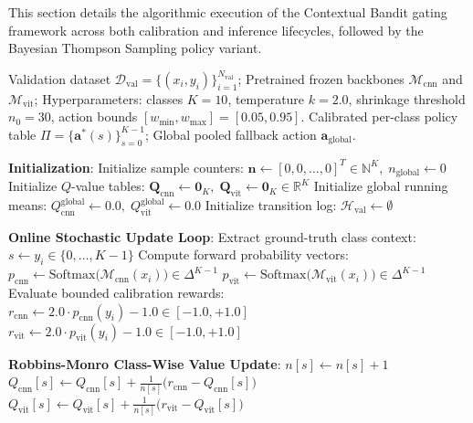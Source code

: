 \documentclass[10pt,journal,compsoc]{IEEEtran}
\begin{document}
This section details the algorithmic execution of the Contextual Bandit gating framework across both calibration and inference lifecycles, followed by the Bayesian Thompson Sampling policy variant.

\begin{algorithm}[H]
\caption{Offline Calibration via Robbins-Monro Value Estimation}
\label{alg:calibration}
\begin{algorithmic}[1]
\REQUIRE Validation dataset $\mathcal{D}_{\text{val}} = \{(x_i, y_i)\}_{i=1}^{N_{\text{val}}}$; Pretrained frozen backbones $\mathcal{M}_{\text{cnn}}$ and $\mathcal{M}_{\text{vit}}$; Hyperparameters: classes $K=10$, temperature $k=2.0$, shrinkage threshold $n_0=30$, action bounds $[w_{\min}, w_{\max}] = [0.05, 0.95]$.
\ENSURE Calibrated per-class policy table $\Pi = \{\mathbf{a}^*(s)\}_{s=0}^{K-1}$; Global pooled fallback action $\mathbf{a}_{\text{global}}$.

\STATE \textbf{Initialization}:
\STATE Initialize sample counters: $\mathbf{n} \leftarrow [0, 0, \dots, 0]^T \in \mathbb{N}^K, \; n_{\text{global}} \leftarrow 0$
\STATE Initialize $Q$-value tables: $\mathbf{Q}_{\text{cnn}} \leftarrow \mathbf{0}_K, \; \mathbf{Q}_{\text{vit}} \leftarrow \mathbf{0}_K \in \mathbb{R}^K$
\STATE Initialize global running means: $Q_{\text{cnn}}^{\text{global}} \leftarrow 0.0, \; Q_{\text{vit}}^{\text{global}} \leftarrow 0.0$
\STATE Initialize transition log: $\mathcal{H}_{\text{val}} \leftarrow \emptyset$

\STATE \textbf{Online Stochastic Update Loop}:
    \STATE Extract ground-truth class context: $s \leftarrow y_i \in \{0, \dots, K-1\}$
    \STATE Compute forward probability vectors:
    \STATE \quad $p_{\text{cnn}} \leftarrow \text{Softmax}\big(\mathcal{M}_{\text{cnn}}(x_i)\big) \in \Delta^{K-1}$
    \STATE \quad $p_{\text{vit}} \leftarrow \text{Softmax}\big(\mathcal{M}_{\text{vit}}(x_i)\big) \in \Delta^{K-1}$
    \STATE Evaluate bounded calibration rewards:
    \STATE \quad $r_{\text{cnn}} \leftarrow 2.0 \cdot p_{\text{cnn}}(y_i) - 1.0 \in [-1.0, +1.0]$
    \STATE \quad $r_{\text{vit}} \leftarrow 2.0 \cdot p_{\text{vit}}(y_i) - 1.0 \in [-1.0, +1.0]$
    
    \STATE \textbf{Robbins-Monro Class-Wise Value Update}:
    \STATE $n[s] \leftarrow n[s] + 1$
    \STATE $Q_{\text{cnn}}[s] \leftarrow Q_{\text{cnn}}[s] + \frac{1}{n[s]} \Big( r_{\text{cnn}} - Q_{\text{cnn}}[s] \Big)$
    \STATE $Q_{\text{vit}}[s] \leftarrow Q_{\text{vit}}[s] + \frac{1}{n[s]} \Big( r_{\text{vit}} - Q_{\text{vit}}[s] \Big)$
    

\end{algorithmic}
\end{algorithm}
\end{document}

